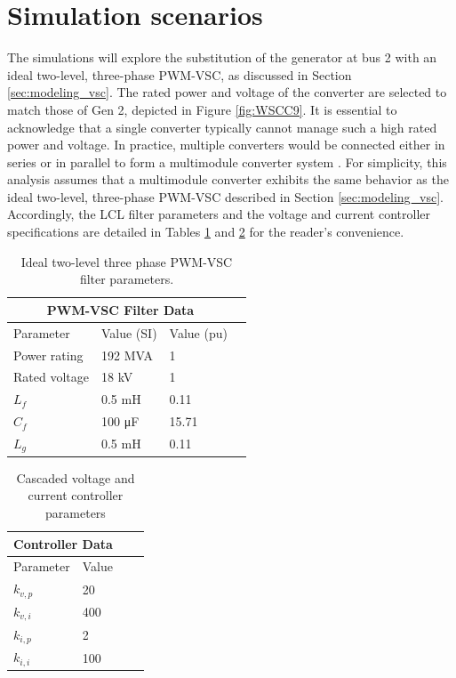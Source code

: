 \section{Simulation scenarios}

The simulations will explore the substitution of the generator at bus 2 with an
ideal two-level, three-phase PWM-VSC, as discussed in Section
\ref{sec:modeling_vsc}.  The rated power and voltage of the converter are
selected to match those of Gen 2, depicted in Figure \ref{fig:WSCC9}. It is
essential to acknowledge that a single converter typically cannot manage such a
high rated power and voltage. In practice, multiple converters would be
connected either in series or in parallel to form a multimodule converter system
\cite{tayyebi2020power, yazdani2010voltage}. For simplicity, this analysis
assumes that a multimodule converter exhibits the same behavior as the ideal
two-level, three-phase PWM-VSC described in Section \ref{sec:modeling_vsc}.
Accordingly, the LCL filter parameters and the voltage and current controller
specifications are detailed in Tables \ref{tab:pwm_vsc_parameters} and
\ref{tab:vsc_controller_parameters} for the reader's convenience.

\begin{table}[h!]
    \centering
    \begin{tabular}{@{}llll@{}}
    \toprule
    \multicolumn{3}{c}{\textbf{PWM-VSC Filter Data}} \\
    \midrule
        Parameter & Value (SI) & Value (pu) \\
        \midrule
        Power rating & 192 MVA & 1 \\
        Rated voltage & 18 kV & 1 \\
        \(L_f\) & 0.5 mH & 0.11 \\
        \(C_f\) & 100 \si{\micro\farad} & 15.71 \\
        \(L_g\) & 0.5 mH & 0.11 \\
    \bottomrule
    \end{tabular}
    \caption{Ideal two-level three phase PWM-VSC filter parameters.}
    \label{tab:pwm_vsc_parameters}
\end{table}

\begin{table}[h!]
    \centering
    \begin{tabular}{@{}llll@{}}
    \toprule
    \multicolumn{2}{c}{\textbf{Controller Data}} \\
    \midrule
        Parameter & Value \\
        \midrule
        \(k_{v,p}\) & 20 \\
        \(k_{v,i}\) & 400 \\
        \(k_{i,p}\) & 2 \\
        \(k_{i,i}\) & 100 \\
    \bottomrule
    \end{tabular}
    \caption{Cascaded voltage and current controller parameters}
    \label{tab:vsc_controller_parameters}
\end{table}

